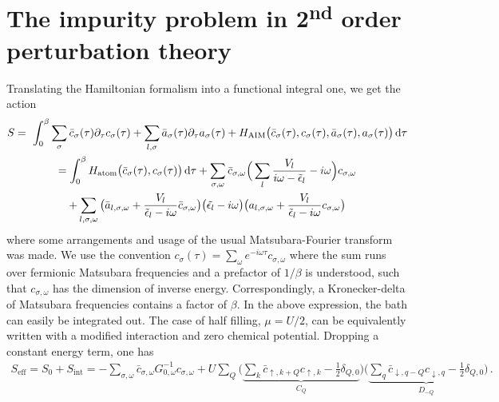 \documentclass[11pt]{article}
\begin{document}
\section{The impurity problem in 2\textsuperscript{nd} order perturbation theory}

Translating the Hamiltonian formalism into a functional integral one, we get the action
%
\begin{gather*}
S = \
	\int_0^{\beta} \sum_{\sigma} \bar{c}_{\sigma} (\tau) \partial_{\tau} c_{\sigma} (\tau) 
	+ \sum_{l, \sigma} \bar{a}_{\sigma} (\tau) \partial_{\tau} a_{\sigma} (\tau)
	+ H_{\text{AIM}} \big( \bar{c}_{\sigma} (\tau), c_{\sigma} (\tau), \bar{a}_{\sigma} (\tau), a_{\sigma} (\tau) \big)
	\dif \tau
	\\
	 = \int_0^{\beta}  H_{\text{atom}} \big( \bar{c}_{\sigma} (\tau), c_{\sigma} (\tau) \big)  \dif \tau 
	+ \sum_{\sigma, \omega} \bar{c}_{\sigma, \omega} 
	\Big( \sum_{l} \frac{V_l}{i\omega - \tilde{\epsilon}_l} - i\omega \Big)
	c_{\sigma, \omega} 
	\\
	+ \sum_{l, \sigma, \omega} \big( \bar{a}_{l, \sigma, \omega} + \frac{V_l}{\tilde{\epsilon}_l - i\omega} \bar{c}_{\sigma, \omega} \big) 
	\big( \tilde{\epsilon_l} - i\omega \big)
	\big( a_{l, \sigma, \omega} + \frac{V_l}{\tilde{\epsilon}_l - i\omega} c_{\sigma, \omega} \big) 
\end{gather*}
%
where some arrangements and usage of the usual Matsubara-Fourier transform was made. We use the convention
$
c_{\sigma} (\tau) = \sum_{\omega} e^{-i\omega \tau} c_{\sigma, \omega}
$
where the sum runs over fermionic Matsubara frequencies and a prefactor of $1/ \beta$ is understood, such that $c_{\sigma, \omega}$ has the dimension of inverse energy. Correspondingly, a Kronecker-delta of Matsubara frequencies contains a factor of $\beta$. In the above expression, the bath can easily be integrated out. The case of half filling, $\mu = U/2$, can be equivalently written with a modified interaction and zero chemical potential. Dropping a constant energy term, one has
%
\begin{gather*}
S_{\text{eff}} = S_0 + S_{\text{int}} =
	 - \sum_{\sigma, \omega} \bar{c}_{\sigma, \omega} G_{0, \omega}^{-1}
	c_{\sigma, \omega} 
	+ U \sum_{Q} \Big( 
	\underbrace{
	\sum_{k} \bar{c}_{\uparrow,k+Q} c_{\uparrow,k} - \frac{1}{2} \delta_{Q,0} 
	}_{C_Q}
	\Big) \Big(
	\underbrace{
	\sum_{q} \bar{c}_{\downarrow,q-Q} c_{\downarrow,q} - \frac{1}{2} \delta_{Q,0}
	}_{D_{-Q}}
	\Big)
\, .
\end{gather*}
\end{document}
